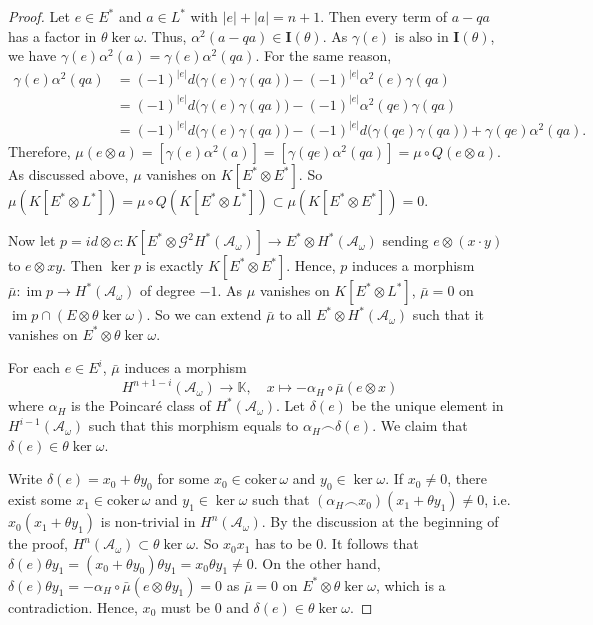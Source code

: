 \documentclass[10pt,a4paper]{amsart}
\DeclareMathOperator{\im}{im}
\begin{document}
\begin{proof}
Let $e\in E^*$ and $a\in L^*$ with $|e|+|a|=n+1$. Then every term of $a-qa$ has a factor in $\theta\ker\omega$. Thus, $\alpha^2(a-qa)\in\mathbf{I}(\theta)$. As $\gamma(e)$ is also in $\mathbf{I}(\theta)$, we have $\gamma(e)\alpha^2(a)=\gamma(e)\alpha^2(qa)$. For the same reason,
\begin{align*}
\gamma(e)\alpha^2(qa) &= (-1)^{|e|}d\big(\gamma(e)\gamma(qa)\big)-(-1)^{|e|}\alpha^2(e)\gamma(qa) \\
&= (-1)^{|e|}d\big(\gamma(e)\gamma(qa)\big)-(-1)^{|e|}\alpha^2(qe)\gamma(qa) \\
&= (-1)^{|e|}d\big(\gamma(e)\gamma(qa)\big)-(-1)^{|e|}d\big(\gamma(qe)\gamma(qa)\big)+\gamma(qe)\alpha^2(qa).
\end{align*}
Therefore, $\mu(e\otimes a)=[\gamma(e)\alpha^2(a)]=[\gamma(qe)\alpha^2(qa)]=\mu\circ Q(e\otimes a)$. As discussed above, $\mu$ vanishes on $K[E^*\otimes E^*]$. So $\mu(K[E^*\otimes L^*])=\mu\circ Q(K[E^*\otimes L^*])\subset\mu(K[E^*\otimes E^*])=0$.

Now let $p=id\otimes c: K[E^*\otimes\mathcal{G}^2H^*(\mathcal{A}_{\omega})]\to E^*\otimes H^*(\mathcal{A}_{\omega})$ sending $e\otimes(x\cdot y)$ to $e\otimes xy$. Then $\ker p$ is exactly $K[E^*\otimes E^*]$. Hence, $p$ induces a morphism $\bar{\mu}:\im p\to H^*(\mathcal{A}_{\omega})$ of degree $-1$. As $\mu$ vanishes on $K[E^*\otimes L^*]$, $\bar{\mu}=0$ on $\im p\cap (E\otimes\theta\ker\omega)$. So we can extend $\bar{\mu}$ to all $E^*\otimes H^*(\mathcal{A}_{\omega})$ such that it vanishes on $E^*\otimes\theta\ker\omega$.

For each $e\in E^i$, $\bar{\mu}$ induces a morphism
$$
H^{n+1-i}(\mathcal{A_{\omega}})\to \mathbb{K}, \quad x\mapsto -\alpha_H\circ\bar{\mu}(e\otimes x)
$$
where $\alpha_H$ is the Poincar\'e class of $H^*(\mathcal{A_{\omega}})$. Let $\delta(e)$ be the unique element in $H^{i-1}(\mathcal{A_{\omega}})$ such that this morphism equals to $\alpha_H\frown\delta(e)$. We claim that $\delta(e)\in\theta\ker\omega$.

Write $\delta(e)=x_0+\theta y_0$ for some $x_0\in\text{coker}\,\omega$ and $y_0\in\ker\omega$. If $x_0\neq 0$, there exist some $x_1\in\text{coker}\,\omega$ and $y_1\in\ker\omega$ such that $(\alpha_H\frown x_0)(x_1+\theta y_1)\neq 0$, i.e. $x_0(x_1+\theta y_1)$ is non-trivial in $H^n(\mathcal{A_{\omega}})$. By the discussion at the beginning of the proof, $H^n(\mathcal{A_{\omega}})\subset \theta\ker\omega$. So $x_0x_1$ has to be 0. It follows that $\delta(e)\theta y_1=(x_0+\theta y_0)\theta y_1=x_0\theta y_1\neq 0$. On the other hand, $\delta(e)\theta y_1=-\alpha_H\circ\bar{\mu}(e\otimes\theta y_1)=0$ as $\bar{\mu}=0$ on $E^*\otimes\theta\ker\omega$, which is a contradiction. Hence, $x_0$ must be 0 and $\delta(e)\in\theta\ker\omega$.


\end{proof}
\end{document}
